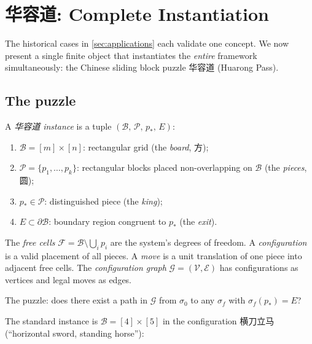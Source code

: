 \chapter{华容道: Complete Instantiation}\label{sec:huarongdao}

The historical cases in \cref{sec:applications} each validate one
concept. We now present a single finite object that instantiates the
\emph{entire} framework simultaneously: the Chinese sliding block
puzzle 华容道 (Huarong Pass).

\section{The puzzle}

\begin{definition}[华容道]\label{def:huarongdao}
A \emph{华容道 instance} is a tuple
$(\mathcal{B},\, \mathcal{P},\, p_*,\, E)$:
\begin{enumerate}[label=(\roman*)]
  \item $\mathcal{B} = [m] \times [n]$: rectangular grid (the
  \emph{board}, 方);
  \item $\mathcal{P} = \{p_1, \ldots, p_k\}$: rectangular blocks
  placed non-overlapping on $\mathcal{B}$ (the \emph{pieces}, 圆);
  \item $p_* \in \mathcal{P}$: distinguished piece (the \emph{king});
  \item $E \subset \partial\mathcal{B}$: boundary region congruent
  to $p_*$ (the \emph{exit}).
\end{enumerate}
The \emph{free cells} $\mathcal{F} = \mathcal{B} \setminus
\bigcup_i p_i$ are the system's degrees of freedom. A
\emph{configuration} is a valid placement of all pieces. A \emph{move}
is a unit translation of one piece into adjacent free cells. The
\emph{configuration graph} $\mathcal{G} = (\mathcal{V}, \mathcal{E})$
has configurations as vertices and legal moves as edges.

The puzzle: does there exist a path in $\mathcal{G}$ from $\sigma_0$
to any $\sigma_f$ with $\sigma_f(p_*) = E$?
\end{definition}

The standard instance is $\mathcal{B} = [4] \times [5]$ in the
configuration 横刀立马 (``horizontal sword, standing horse''):

